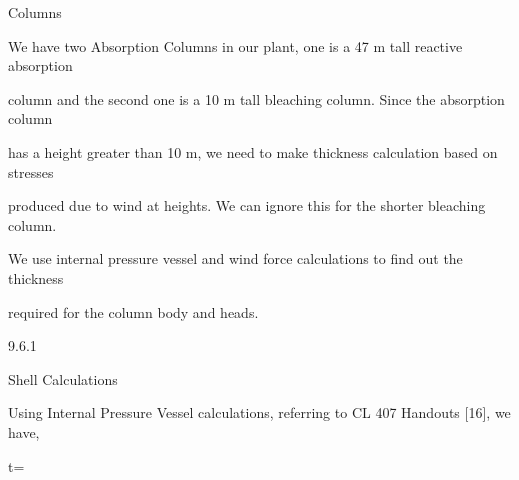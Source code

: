 \documentclass[a4paper,portrait,12pt]{article}
\begin{document}
\begin{flushleft}
Columns
\end{flushleft}





\begin{flushleft}
We have two Absorption Columns in our plant, one is a 47 m tall reactive absorption
\end{flushleft}


\begin{flushleft}
column and the second one is a 10 m tall bleaching column. Since the absorption column
\end{flushleft}


\begin{flushleft}
has a height greater than 10 m, we need to make thickness calculation based on stresses
\end{flushleft}


\begin{flushleft}
produced due to wind at heights. We can ignore this for the shorter bleaching column.
\end{flushleft}


\begin{flushleft}
We use internal pressure vessel and wind force calculations to find out the thickness
\end{flushleft}


\begin{flushleft}
required for the column body and heads.
\end{flushleft}





9.6.1





\begin{flushleft}
Shell Calculations
\end{flushleft}





\begin{flushleft}
Using Internal Pressure Vessel calculations, referring to CL 407 Handouts [16], we have,
\end{flushleft}


\begin{flushleft}
t=
\end{flushleft}
\end{document}
